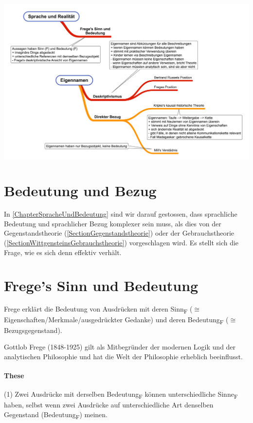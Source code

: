 \documentclass[../main.tex]{subfiles}
\begin{document}
\includegraphics[width=\textwidth]{images/Sprache_und_Realitaet_Uebersicht.png}

\section{Bedeutung und Bezug}
In \ref{ChapterSpracheUndBedeutung} sind wir darauf gestossen, dass sprachliche Bedeutung und sprachlicher Bezug komplexer sein muss, als dies von der Gegenstandstheorie (\ref{SectionGegenstandstheorie}) oder der Gebrauchstheorie (\ref{SectionWittgensteinsGebrauchstheorie}) vorgeschlagen wird. Es stellt sich die Frage, wie es sich denn effektiv verhält. 

\section{Frege's Sinn und Bedeutung}\label{SectionFregesSinnUndBedeutung}
\begin{warningbox}
Frege erklärt die Bedeutung von Ausdrücken mit deren Sinn\textsubscript{F} ($\cong$ Eigenschaften/Merkmale/ausgedrückter Gedanke) und deren Bedeutung\textsubscript{F} ($\cong$ Bezugsgegenstand). 
\end{warningbox}


Gottlob Frege (1848-1925) gilt als Mitbegründer der modernen Logik und der analytischen Philosophie und hat die Welt der Philosophie erheblich beeinflusst. 

\paragraph{These} (1) Zwei Ausdrücke mit derselben Bedeutung\textsubscript{F} können unterschiedliche Sinne\textsubscript{F} haben, selbst wenn zwei Ausdrücke auf unterschiedliche Art denselben Gegenstand (Bedeutung\textsubscript{F}) meinen.
\end{document}
